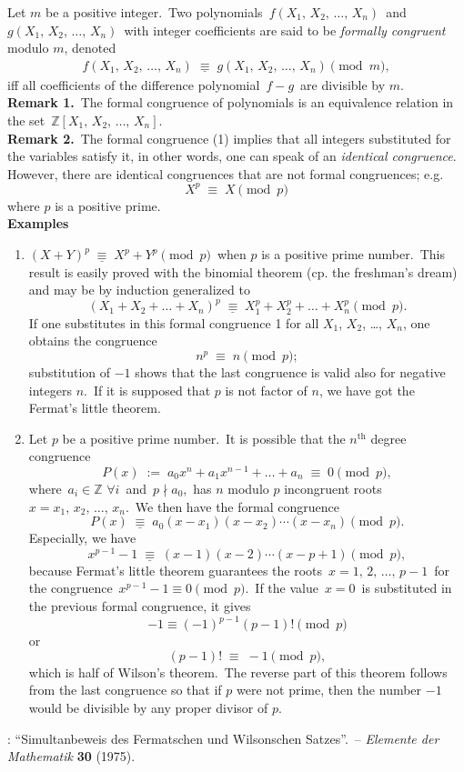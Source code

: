 \documentclass[12pt]{article}
\begin{document}
Let $m$ be a positive integer.\, Two polynomials \,$f(X_1,\,X_2,\,\ldots,\,X_n)$\, and\, $g(X_1,\,X_2,\,\ldots,\,X_n)$\, with integer coefficients are said to be \emph{formally congruent} modulo $m$, denoted
\begin{align}
f(X_1,\,X_2,\,\ldots,\,X_n) \;\underline{\equiv}\; g(X_1,\,X_2,\,\ldots,\,X_n) \pmod{m},
\end{align}
iff all coefficients of the difference polynomial\, $f\!-\!g$\, are divisible by $m$.\\

\textbf{Remark 1.}\, The formal congruence of polynomials is an equivalence relation in the set\, 
$\mathbb{Z}[X_1,\,X_2,\,\ldots,\,X_n]$.\\

\textbf{Remark 2.}\, The formal congruence (1) implies that all integers substituted for the variables satisfy it, in other words, one can speak of an \emph{identical congruence}.\, However, there are identical congruences that are not formal congruences; e.g.
$$X^{p} \;\equiv\; X \pmod{p}$$
where $p$ is a positive prime.\\

\textbf{Examples}
\begin{enumerate}

 \item $(X\!+\!Y)^p \;\underline{\equiv}\; X^p\!+\!Y^p \pmod{p}$\, when $p$ is a positive prime number.\, This result is easily proved with the binomial theorem (cp. the freshman's dream) and may be by induction generalized to
   $$(X_1\!+\!X_2\!+\ldots+\!X_n)^p \;\underline{\equiv}\; X_1^p\!+\!X_2^p\!+\ldots+\!X_n^p \pmod{p}.$$
If one substitutes in this formal congruence 1 for all $X_1$, $X_2$, \ldots, $X_n$, one obtains the congruence
           $$n^p \;\equiv\; n \pmod p;$$
 substitution of $-1$ shows that the last congruence is valid also for negative integers $n$.\, If it is supposed that $p$ is not factor of $n$, we have got the Fermat's little theorem.

 \item Let $p$ be a positive prime number.\, It is possible that the $n^\mathrm{th}$ degree congruence
   $$P(x) \;:=\; a_0x^n\!+\!a_1x^{n-1}\!+\ldots+\!a_n \;\equiv\; 0 \pmod{p},$$
where\, $a_i \in \mathbb{Z} \,\, \forall i$\, and\, $p \nmid a_0$,\, has $n$ modulo $p$ incongruent roots\, $x = x_1,\,x_2,\,\ldots,\,x_n$.\, We then have the formal congruence
  $$P(x) \;\underline{\equiv}\; a_0(x\!-\!x_1)(x\!-\!x_2)\cdots(x\!-\!x_n) \pmod{p}.$$
Especially, we have
  $$x^{p-1}\!-\!1 \;\underline{\equiv}\; (x\!-\!1)(x\!-\!2)\cdots(x\!-\!p\!+\!1) \pmod{p},$$
because Fermat's little theorem guarantees the roots\, $x = 1,\,2,\,\ldots,\,p\!-\!1$\, for the congruence\, 
$x^{p-1}\!-\!1 \equiv 0 \pmod{p}$.\, If the value\, $x = 0$\, is substituted in the previous formal congruence, it gives
  $$-1 \equiv (-1)^{p-1}(p\!-\!1)! \pmod{p}$$
or 
  $$(p\!-\!1)! \;\equiv\; -1 \pmod{p},$$
which is half of Wilson's theorem.\, The reverse part of this theorem follows from the last congruence so that if $p$ were not prime, then the number $-1$ would be divisible by any proper divisor of $p$.
\end{enumerate}

\begin{thebibliography}{8}
: ``Simultanbeweis des Fermatschen und Wilsonschen Satzes''.\, -- \emph{Elemente der Mathematik} \textbf{30} (1975).
\end{thebibliography}

\end{document}
